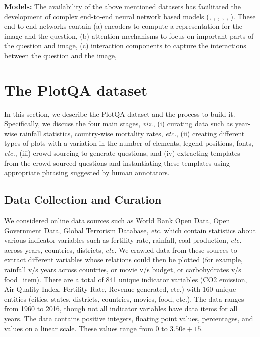 \documentclass[10pt,twocolumn,letterpaper]{article}
\begin{document}
\noindent \textbf{Models:}
The availability of the above mentioned datasets has facilitated the development of complex end-to-end neural network based models (\cite{SAN}, \cite{LuYBP16}, \cite{YangHGDS16}, \cite{NohH16}, \cite{SantoroRBMPBL17}, ).
These end-to-end networks contain (a) encoders to compute a representation for the image and the question, (b) attention mechanisms to focus on important parts of the question and image, (c) interaction components to capture the interactions between the question and the image, 
\section{The PlotQA dataset}

In this section, we describe the PlotQA dataset and the process to build it. 
Specifically, we discuss the four main stages, \textit{viz.}, (i) curating data such as year-wise rainfall statistics, country-wise mortality rates, \textit{etc.}, (ii) creating different types of plots with a variation in the number of elements, legend positions, fonts, \textit{etc.}, (iii) crowd-sourcing to generate questions, and (iv) extracting templates from the crowd-sourced questions and instantiating these templates using appropriate phrasing suggested by human annotators.

\subsection{Data Collection and Curation}

We considered online data sources such as World Bank Open Data, Open Government Data, Global Terrorism Database, \textit{etc.} which contain statistics about various indicator variables such as fertility rate, rainfall, coal production, \textit{etc.} across years, countries, districts, \textit{etc.} 
We crawled data from these sources to extract different variables whose relations could then be plotted (for example, rainfall v/s years across countries, or movie v/s budget, or carbohydrates v/s food\_item). 
There are a total of 841 unique indicator variables (CO2 emission, Air Quality Index, Fertility Rate, Revenue generated, etc.) with 160 unique entities (cities, states, districts, countries, movies, food, etc.).
The data ranges from 1960 to 2016, though not all indicator variables have data items for all years.
The data contains positive integers, floating point values, percentages, and values on a linear scale. These values range from $0$ to $3.50\mathrm{e+}15$. 
\end{document}
